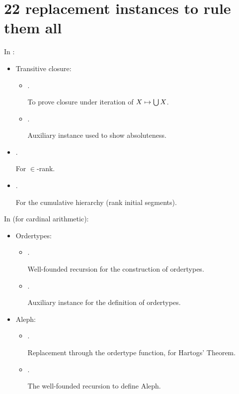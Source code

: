 \section{22 replacement instances to rule them all}
\label{sec:repl-instances-appendix}

In :

\begin{itemize}
\item Transitive closure:
  \begin{itemize}
  \item
    .

    To prove closure under iteration of $X\mapsto\mathop{\textstyle\bigcup} X$.
  \item
    .

    Auxiliary instance used to show absoluteness.
  \end{itemize}
\item {}.
  
  For $\in$-rank.
\item {}.

  For the cumulative hierarchy (rank initial segments).
\end{itemize}

In  (for cardinal arithmetic):
\begin{itemize}
\item Ordertypes:
  \begin{itemize}
  \item
    .

    Well-founded recursion for the construction of ordertypes.
  \item
    .
    
    Auxiliary instance for the definition of ordertypes.
  \end{itemize}
\item Aleph:
  \begin{itemize}
  \item
    .

    Replacement through the ordertype function, for Hartogs' Theorem.
  \item
    .

    The well-founded recursion to define Aleph.
  \end{itemize}
\end{itemize}

